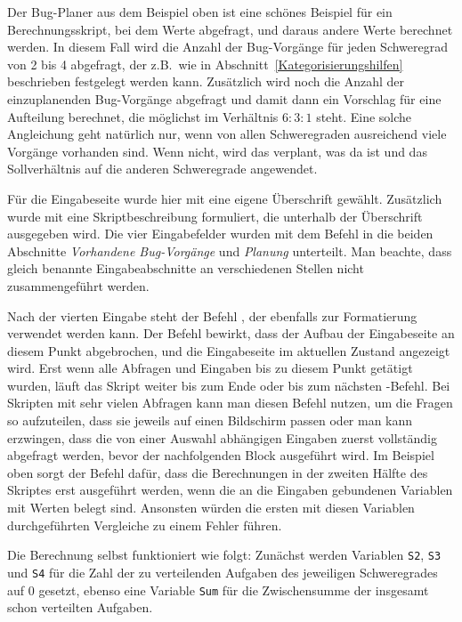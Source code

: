 Der Bug-Planer aus dem Beispiel oben ist eine schönes Beispiel für ein Berechnungsskript, bei dem Werte abgefragt, und daraus andere Werte berechnet werden. In diesem Fall wird die Anzahl der Bug-Vorgänge für jeden Schweregrad von 2 bis 4 abgefragt, der z.B.\ wie in Abschnitt~\ref{Kategorisierungshilfen} beschrieben festgelegt werden kann. Zusätzlich wird noch die Anzahl der einzuplanenden Bug-Vorgänge abgefragt und damit dann ein Vorschlag für eine Aufteilung berechnet, die möglichst im Verhältnis $6:3:1$ steht. Eine solche Angleichung geht natürlich nur, wenn von allen Schweregraden ausreichend viele Vorgänge vorhanden sind. Wenn nicht, wird das verplant, was da ist und das Sollverhältnis auf die anderen Schweregrade angewendet.

Für die Eingabeseite wurde hier mit  eine eigene Überschrift gewählt. Zusätzlich wurde mit  eine Skriptbeschreibung formuliert, die unterhalb der Überschrift ausgegeben wird. Die vier Eingabefelder wurden mit dem Befehl  in die beiden Abschnitte \emph{Vorhandene Bug-Vorgänge} und \emph{Planung} unterteilt. Man beachte, dass gleich benannte Eingabeabschnitte an verschiedenen Stellen nicht zusammengeführt werden.

Nach der vierten Eingabe steht der Befehl , der ebenfalls zur Formatierung verwendet werden kann. Der Befehl bewirkt, dass der Aufbau der Eingabeseite an diesem Punkt abgebrochen, und die Eingabeseite im aktuellen Zustand angezeigt wird. Erst wenn alle Abfragen und Eingaben bis zu diesem Punkt getätigt wurden, läuft das Skript weiter bis zum Ende oder bis zum nächsten -Befehl. Bei Skripten mit sehr vielen Abfragen kann man diesen Befehl nutzen, um die Fragen so aufzuteilen, dass sie jeweils auf einen Bildschirm passen oder man kann erzwingen, dass die von einer Auswahl abhängigen Eingaben zuerst vollständig abgefragt werden, bevor der nachfolgenden Block ausgeführt wird. Im Beispiel oben sorgt der Befehl dafür, dass die Berechnungen in der zweiten Hälfte des Skriptes erst ausgeführt werden, wenn die an die Eingaben gebundenen Variablen mit Werten belegt sind. Ansonsten würden die ersten mit diesen Variablen durchgeführten Vergleiche zu einem Fehler führen.

Die Berechnung selbst funktioniert wie folgt: Zunächst werden Variablen \verb|S2|, \verb|S3| und \verb|S4| für die Zahl der zu verteilenden Aufgaben des jeweiligen Schweregrades auf $0$ gesetzt, ebenso eine Variable \verb|Sum| für die Zwischensumme der insgesamt schon verteilten Aufgaben. 

